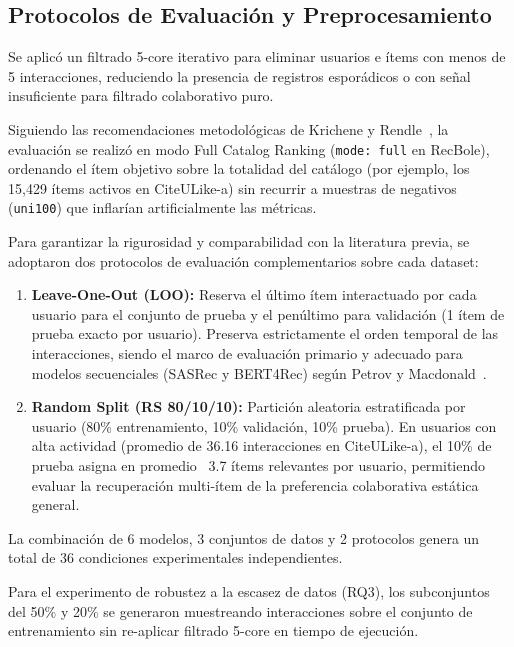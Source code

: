 \documentclass[journal]{IEEEtran}
\begin{document}
\subsection{Protocolos de Evaluación y Preprocesamiento}
Se aplicó un filtrado 5-core iterativo para eliminar usuarios e ítems con menos de 5 interacciones, reduciendo la presencia de registros esporádicos o con señal insuficiente para filtrado colaborativo puro.

Siguiendo las recomendaciones metodológicas de Krichene y Rendle~\cite{krichene2020sampled}, la evaluación se realizó en modo Full Catalog Ranking (\texttt{mode: full} en RecBole), ordenando el ítem objetivo sobre la totalidad del catálogo (por ejemplo, los 15,429 ítems activos en CiteULike-a) sin recurrir a muestras de negativos (\texttt{uni100}) que inflarían artificialmente las métricas.

Para garantizar la rigurosidad y comparabilidad con la literatura previa, se adoptaron dos protocolos de evaluación complementarios sobre cada dataset:
\begin{enumerate}
    \item \textbf{Leave-One-Out (LOO):} Reserva el último ítem interactuado por cada usuario para el conjunto de prueba y el penúltimo para validación (1 ítem de prueba exacto por usuario). Preserva estrictamente el orden temporal de las interacciones, siendo el marco de evaluación primario y adecuado para modelos secuenciales (SASRec y BERT4Rec) según Petrov y Macdonald~\cite{petrov2023effective}.
    \item \textbf{Random Split (RS 80/10/10):} Partición aleatoria estratificada por usuario (80\% entrenamiento, 10\% validación, 10\% prueba). En usuarios con alta actividad (promedio de 36.16 interacciones en CiteULike-a), el 10\% de prueba asigna en promedio ~3.7 ítems relevantes por usuario, permitiendo evaluar la recuperación multi-ítem de la preferencia colaborativa estática general.
\end{enumerate}

La combinación de 6 modelos, 3 conjuntos de datos y 2 protocolos genera un total de 36 condiciones experimentales independientes.

Para el experimento de robustez a la escasez de datos (RQ3), los subconjuntos del 50\% y 20\% se generaron muestreando interacciones sobre el conjunto de entrenamiento sin re-aplicar filtrado 5-core en tiempo de ejecución.
\end{document}
